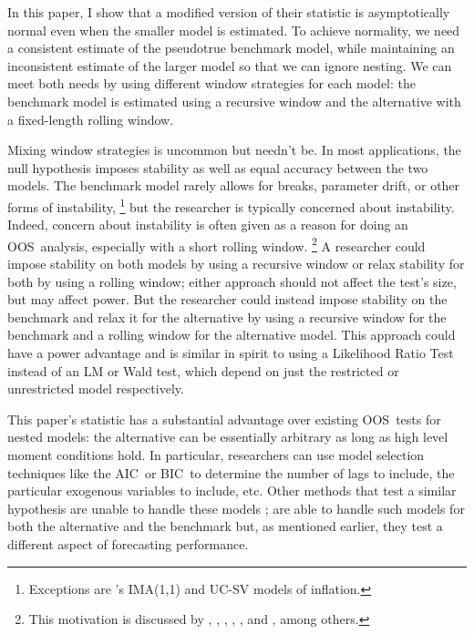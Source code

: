 \documentclass[12pt,fleqn]{article}
\newcommand\citepos[2][]{\citeauthor{#2}'s \citeyearpar[#1]{#2}}
\theoremstyle{definition}
\newcommand{\aic}{AIC}
\newcommand{\bic}{BIC}
\newcommand{\oos}{OOS}
\begin{document}
In this paper, I show that a modified version of their statistic is
asymptotically normal even when the smaller model is estimated.  To
achieve normality, we need a consistent estimate of the pseudotrue
benchmark model, while maintaining an inconsistent estimate of the
larger model so that we can ignore nesting.  We can meet both needs by
using different window strategies for each model: the benchmark model
is estimated using a recursive window and the alternative with a
fixed-length rolling window.

Mixing window strategies is uncommon but needn't be. In most
applications, the null hypothesis imposes stability as well as equal
accuracy between the two models.  The benchmark model rarely allows
for breaks, parameter drift, or other forms of
instability,%
\footnote{Exceptions are \citepos{StW:07}
  IMA(1,1) and UC-SV models of inflation.} %
but the
researcher is typically concerned about instability.  Indeed, concern
about instability is often given as a reason for doing an \oos\
analysis, especially with a short rolling window.%
\footnote{This
  motivation is discussed by \citet{StW:03}, \citet{PeT:05,PeT:07},
  \cite{GiW:06}, \citet{GoW:08}, \citet{ClM:09c}, and
  \cite{GiR:09,GiR:10}, among others.} %
A researcher could impose
stability on both models by using a recursive window or relax
stability for both by using a rolling window; either approach should
not affect the test's size, but may affect power.  But the researcher
could instead impose stability on the benchmark and relax it for the
alternative by using a recursive window for the benchmark and a
rolling window for the alternative model.  This approach could have a
power advantage and is similar in spirit to using a Likelihood Ratio
Test instead of an LM or Wald test, which depend on just the
restricted or unrestricted model respectively.

This paper's statistic has a substantial advantage over existing \oos\
tests for nested models: the alternative can be essentially arbitrary
as long as high level moment conditions hold.  In particular,
researchers can use model selection techniques like the \aic\ or \bic\
to determine the number of lags to include, the particular exogenous
variables to include, etc.  Other methods that test a similar
hypothesis are unable to handle these models \citep[except][which does
not allow the benchmark to be estimated]{ClW:06}; \citet{GiW:06} are
able to handle such models for both the alternative and the benchmark
but, as mentioned earlier, they test a different aspect of forecasting
performance.
\end{document}

